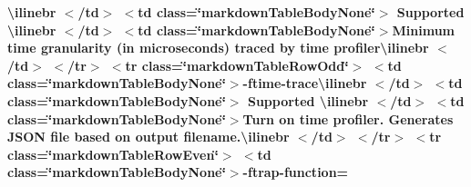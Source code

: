 \begin{longtabu}
{\bfseries{{\ttfamily \textbackslash{}ilinebr \texorpdfstring{$<$}{<}/td\texorpdfstring{$>$}{>} \texorpdfstring{$<$}{<}td class=\char`\"{}markdown\+Table\+Body\+None\char`\"{}\texorpdfstring{$>$}{>} Supported \textbackslash{}ilinebr \texorpdfstring{$<$}{<}/td\texorpdfstring{$>$}{>} \texorpdfstring{$<$}{<}td class=\char`\"{}markdown\+Table\+Body\+None\char`\"{}\texorpdfstring{$>$}{>}}Minimum time granularity (in microseconds) traced by time profiler{\ttfamily \textbackslash{}ilinebr \texorpdfstring{$<$}{<}/td\texorpdfstring{$>$}{>} \texorpdfstring{$<$}{<}/tr\texorpdfstring{$>$}{>} \texorpdfstring{$<$}{<}tr class=\char`\"{}markdown\+Table\+Row\+Odd\char`\"{}\texorpdfstring{$>$}{>} \texorpdfstring{$<$}{<}td class=\char`\"{}markdown\+Table\+Body\+None\char`\"{}\texorpdfstring{$>$}{>}}-\/ftime-\/trace{\ttfamily \textbackslash{}ilinebr \texorpdfstring{$<$}{<}/td\texorpdfstring{$>$}{>} \texorpdfstring{$<$}{<}td class=\char`\"{}markdown\+Table\+Body\+None\char`\"{}\texorpdfstring{$>$}{>} Supported \textbackslash{}ilinebr \texorpdfstring{$<$}{<}/td\texorpdfstring{$>$}{>} \texorpdfstring{$<$}{<}td class=\char`\"{}markdown\+Table\+Body\+None\char`\"{}\texorpdfstring{$>$}{>}}Turn on time profiler. Generates JSON file based on output filename.{\ttfamily \textbackslash{}ilinebr \texorpdfstring{$<$}{<}/td\texorpdfstring{$>$}{>} \texorpdfstring{$<$}{<}/tr\texorpdfstring{$>$}{>} \texorpdfstring{$<$}{<}tr class=\char`\"{}markdown\+Table\+Row\+Even\char`\"{}\texorpdfstring{$>$}{>} \texorpdfstring{$<$}{<}td class=\char`\"{}markdown\+Table\+Body\+None\char`\"{}\texorpdfstring{$>$}{>}}-\/ftrap-\/function=}}


\end{longtabu}
